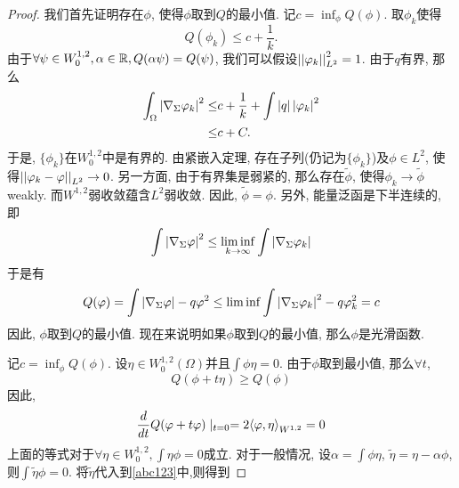 \begin{proof}
    我们首先证明存在$\phi$, 使得$\phi$取到$Q$的最小值. 记$c=\inf_\phi Q(\phi)$.  取$\phi_k$使得
    \begin{equation}
        Q(\phi_k) \le c+\frac{1}{k}.
    \end{equation}
    由于$\forall \psi \in W^{1,2}_0, \alpha \in \mathbb{R}, Q(\alpha \psi)=Q(\psi)$, 我们可以假设${\left | \left | \varphi_k \right | \right |}_{L^2}^2=1$. 由于$q$有界, 那么
    \begin{equation}
        \begin{split}
            \int_\Omega \left | \nabla_\Sigma\varphi_k \right |^2 \le& c+\frac{1}{k} + \int\left | q \right |\left | \varphi_k \right |^2 \\
            \le & c+C.
        \end{split}
    \end{equation}
    于是, $\{\phi_k\}$在$W^{1,2}_0$中是有界的. 由紧嵌入定理, 存在子列(仍记为$\{\phi_k\}$)及$\phi \in L^2$, 使得${\left | \left | \varphi_k -\varphi \right | \right |}_{L^2} \to 0$. 另一方面, 由于有界集是弱紧的, 那么存在$\tilde{\phi}$, 使得$\phi_k \to \tilde{\phi}$ weakly. 而$W^{1,2}$弱收敛蕴含$L^2$弱收敛\cite[定理2.5.11]{Meg}. 因此, $\tilde{\phi}=\phi$. 另外, 能量泛函是下半连续的, 即
    \begin{equation}
        \int \left | \nabla_\Sigma\varphi \right |^2 \le \liminf_{k\to \infty} \int \left | \nabla_\Sigma\varphi_k \right |
    \end{equation}
    于是有
    \begin{equation}
        Q(\varphi)=\int \left | \nabla_\Sigma \varphi \right |-q\varphi^2 \le \liminf \int\left | \nabla_\Sigma \varphi_k \right |^2-q\varphi_k^2 =c
    \end{equation}
    因此, $\phi$取到$Q$的最小值.  现在来说明如果$\phi$取到$Q$的最小值, 那么$\phi$是光滑函数. 
    \par 记$c=\inf_\phi Q(\phi)$. 
    设$\eta \in W^{1,2}_0(\Omega)$并且$\int \phi \eta =0$. 由于$\phi$取到最小值, 那么$\forall t$,
    \begin{equation}
        Q(\phi+t\eta) \ge Q(\phi)
    \end{equation}
    因此,
    \begin{equation} \label{abc123}
        \frac{d}{dt} Q(\varphi+t\varphi)\mid_{t=0} = 2{\left < \varphi, \eta \right >}_{W^{1,2}}=0
    \end{equation}
    上面的等式对于$\forall \eta \in W^{1,2}_0, \int \eta \phi=0$成立. 对于一般情况, 设$\alpha=\int \phi \eta$, $\tilde{\eta}=\eta-\alpha \phi$, 则$\int \tilde{\eta}\phi=0$. 将$\tilde{\eta}$代入到\eqref{abc123}中,则得到

\end{proof}
